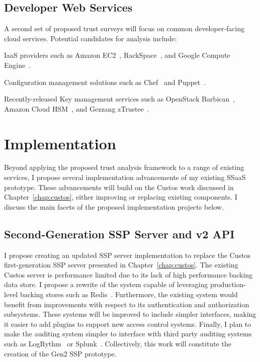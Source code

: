 \subsection{Developer Web Services}

A second set of proposed trust surveys will focus on common
developer-facing cloud services. Potential candidates for analysis
include:

\begin{packed_item}
\item IaaS providers such as Amazon EC2~\cite{amazon-ec2},
  RackSpace~\cite{rackspace-compute}, and Google Compute
  Engine~\cite{google-compute}.
\item Configuration management solutions such as Chef~\cite{chef} and
  Puppet~\cite{puppet}.
\item Recently-released Key management services such as OpenStack
  Barbican~\cite{openstack-barbican}, Amazon Cloud
  HSM~\cite{amazon-hsm}, and Gezzang zTrustee~\cite{gazzang}.
\end{packed_item}

\section{Implementation}
\label{chap:planned:implement}

Beyond applying the proposed trust analysis framework to a range of
existing services, I propose several implementation advancements of my
existing SSaaS prototype. These advancements will build on the Custos
work discussed in Chapter~\ref{chap:custos}, either improving or
replacing existing components. I discuss the main facets of the
proposed implementation projects below.

\subsection{Second-Generation SSP Server and v2 API}

I propose creating an updated SSP server implementation to replace the
Custos first-generation SSP server presented in
Chapter~\ref{chap:custos}. The existing Custos server is performance
limited due to its lack of high performance backing data store. I
propose a rewrite of the system capable of leveraging production-level
backing stores such as Redis~\cite{redis}. Furthermore, the existing
system would benefit from improvements with respect to its
authentication and authorization subsystems. These systems will be
improved to include simpler interfaces, making it easier to add
plugins to support new access control systems. Finally, I plan to make
the auditing system simpler to interface with third party auditing
systems such as LogRythm~\cite{logrythm} or
Splunk~\cite{splunk}. Collectively, this work will constitute the
creation of the Gen2 SSP prototype.

